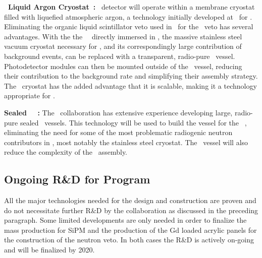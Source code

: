 {\bf \pDUNE\ Liquid Argon Cryostat~\cite{Abi:2017wp,Acciarri:2016wz}:}
\DSks\ detector will operate within a membrane cryostat filled with liquefied atmospheric argon, a technology initially developed at \CERN\ for \pDUNE. Eliminating the organic liquid scintillator veto used in \DSfs\ for the \AAr\ veto has several advantages. With the the \DSks\ \LArTPC\ directly immersed in \AAr, the massive stainless steel vacuum cryostat necessary for \DSfs, and its correspondingly large contribution of background events, can be replaced with a transparent, radio-pure \PMMA\ vessel. Photodetector modules can then be mounted outside of the \PMMA\ vessel, reducing their contribution to the background rate and simplifying their assembly strategy. The \pDUNE\ cryostat has the added advantage that it is scalable, making it a technology appropriate for \Argo.

{\bf Sealed \PMMA\ \TPC~\cite{Boulay:2012er,Nantais:2013jp,Amaudruz:2018gr}:}
The \DEAP\ collaboration has extensive experience developing large, radio-pure sealed \PMMA\ vessels. This technology will be used to build the vessel for the \DSks\ \LArTPC, eliminating the need for some of the most problematic radiogenic neutron contributors in \DSfs, most notably the stainless steel cryostat. The \PMMA\ vessel will also reduce the complexity of the \TPC\ assembly.

\subsection{Ongoing R\&D for \DSks Program}
\label{sec:OngoingRandD}

All the major technologies needed for the design and construction are proven and do not necessitate further R\&D by the collaboration as discussed in the preceding paragraph. Some limited developments are only needed in order to finalize the mass production for SiPM and the production of the Gd loaded acrylic panels for the construction of the neutron veto. In both cases the R\&D is actively on-going and will be finalized by 2020. 





